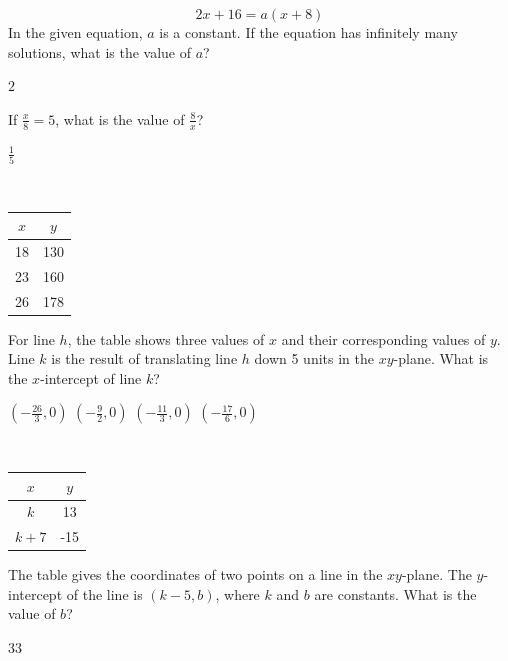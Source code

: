 \newpage

\question[1]
$$
2x + 16 = a(x + 8)
$$
In the given equation, $a$ is a constant. If the equation has infinitely many solutions, what is the value of $a$?
\begin{solutionorbox}
$2$
\end{solutionorbox}

\question[1]
If $\frac{x}{8} = 5$, what is the value of $\frac{8}{x}$?
\begin{solutionorbox}
$\frac{1}{5}$
\end{solutionorbox}


\question[1]
\phantom{\space}\\
\begin{center}
\begin{tabular}{|c|c|}
\hline
$x$ & $y$ \\
\hline
18 & 130 \\
\hline
23 & 160 \\
\hline
26 & 178 \\
\hline
\end{tabular}
\end{center}
For line $h$, the table shows three values of $x$ and their 
corresponding values of $y$. Line $k$ is the result of translating 
line $h$ down 5 units in the $xy$-plane. What is the $x$-intercept of line $k$?
\begin{choices}
  \choice $\left(-\frac{26}{3}, 0\right)$
  \choice $\left(-\frac{9}{2}, 0\right)$
  \choice $\left(-\frac{11}{3}, 0\right)$
  \CorrectChoice $\left(-\frac{17}{6}, 0\right)$
\end{choices}

\newpage


\question[1]
\phantom{\space}\\
\begin{center}
\begin{tabular}{|c|c|}
\hline
$x$ & $y$ \\
\hline
$k$ & 13 \\
\hline
$k+7$ & -15 \\
\hline
\end{tabular}
\end{center}

The table gives the coordinates of two points on a line in the $xy$-plane. The $y$-intercept of the line is $(k-5, b)$, where $k$ and $b$ are constants. What is the value of $b$?
\begin{solutionorbox}
$33$
\end{solutionorbox}


